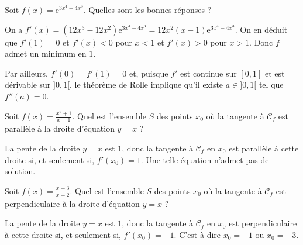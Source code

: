 \begin{question}

Soit $\displaystyle f(x)=\mathrm{e}^{3x^4-4x^3}$. Quelles sont les bonnes réponses ?
\begin{answers}  
    \good{Il existe $a\in ]0,1[$ tel que $f''(a)=0$.}
\end{answers}
\begin{explanations}
On a $f'(x)=(12x^3-12x^2)\mathrm{e}^{3x^4-4x^3}=12x^2(x-1)\mathrm{e}^{3x^4-4x^3}$. On en déduit que $f'(1)=0$ et $f'(x)<0$ pour $x<1$ et $f'(x)>0$ pour $x>1$. Donc $f$ admet un minimum en $1$.

Par ailleurs, $f'(0)=f'(1)=0$ et, puisque $f'$ est continue sur $[0,1]$ et est dérivable sur $]0,1[$, le théorème de Rolle implique qu'il existe $a\in ]0,1[$ tel que $f''(a)=0$.
\end{explanations}
\end{question}






\begin{question}

Soit $\displaystyle f(x)=\frac{x^2+1}{x+1}$. Quel est l'ensemble $S$ des points $x_0$ où la tangente à $\mathcal{C}_f$ est parallèle à la droite d'équation $y=x$ ?
\begin{answers}  
\end{answers}
\begin{explanations}
La pente de la droite $y=x$ est $1$, donc la tangente à $\mathcal{C}_f$ en $x_0$ est parallèle à cette droite si, et seulement si, $f'(x_0)=1$. Une telle équation n'admet pas de solution.
\end{explanations}
\end{question}



\begin{question}

Soit $\displaystyle f(x)=\frac{x+3}{x+2}$. Quel est l'ensemble $S$ des points $x_0$ où la tangente à $\mathcal{C}_f$ est perpendiculaire à la droite d'équation $y=x$ ?
\begin{answers}  
\end{answers}
\begin{explanations}
La pente de la droite $y=x$ est $1$, donc la tangente à $\mathcal{C}_f$ en $x_0$ est perpendiculaire à cette droite si, et seulement si, $f'(x_0)=-1$. C'est-à-dire $x_0=-1$ ou $x_0=-3$.
\end{explanations}
\end{question}




